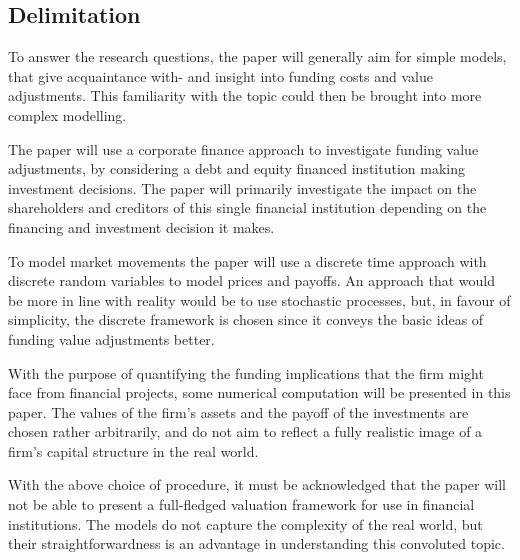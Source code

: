 \documentclass[main.tex]{subfiles}
\begin{document}
    \subsection{Delimitation}

    To answer the research questions, the paper will generally aim for simple models,
    that give acquaintance with- and insight into funding costs and value adjustments.
    This familiarity with the topic could then be brought into more complex modelling.

    The paper will use a corporate finance approach to investigate funding value adjustments,
    by considering a debt and equity financed institution making investment decisions.
    The paper will primarily investigate the impact on the shareholders and creditors 
    of this single financial institution depending on the financing and investment decision it makes.

    To model market movements the paper will use a discrete time approach 
    with discrete random variables to model prices and payoffs.
    An approach that would be more in line with reality would be to use stochastic processes,
    but, in favour of simplicity, the discrete framework is chosen 
    since it conveys the basic ideas of funding value adjustments better.

    With the purpose of quantifying the funding implications that the firm might face from financial projects,
    some numerical computation will be presented in this paper.
    The values of the firm's assets and the payoff of the investments are chosen rather arbitrarily,
    and do not aim to reflect a fully realistic image of a firm's capital structure in the real world.

    With the above choice of procedure, it must be acknowledged that the paper will not be able to
    present a full-fledged valuation framework for use in financial institutions.
    The models do not capture the complexity of the real world,
    but their straightforwardness is an advantage in understanding this convoluted topic.
\end{document}
